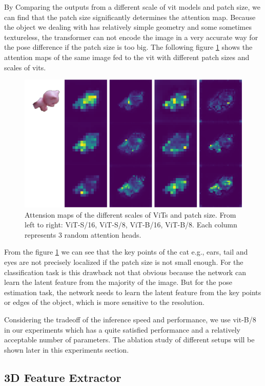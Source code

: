 \documentclass[12pt,DIV14,BCOR12mm,a4paper,footinclude=false,headinclude,parskip=half-,twoside,openright,cleardoublepage=empty,toc=index,bibliography=totoc,listof=totoc]{scrreprt}
\numberwithin{equation}{chapter}
\begin{document}
By Comparing the outputs from a different scale of \gls{vit} models and patch size, we can find that the patch size significantly determines the attention map. Because the object we dealing with has relatively simple geometry and some sometimes textureless, the transformer can not encode the image in a very accurate way for the pose difference if the patch size is too big. The following figure \ref{img:atten_patch} shows the attention maps of the same image fed to the \gls{vit} with different patch sizes and scales of \glspl{vit}. 
\begin{figure}[h]
	\centering
	\includegraphics[width=1.\textwidth]{img/atten_cat.png}
	\caption{Attension maps of the different scales of ViTs and patch size. From left to right: ViT-S/16, ViT-S/8, ViT-B/16, ViT-B/8. Each column represents 3 random attention heads.}
	\label{img:atten_patch}
\end{figure}

From the figure \ref{img:atten_patch} we can see that the key points of the cat e.g., ears, tail and eyes are not precisely localized if the patch size is not small enough. For the classification task is this drawback not that obvious because the network can learn the latent feature from the majority of the image. But for the pose estimation task, the network needs to learn the latent feature from the key points or edges of the object, which is more sensitive to the resolution.

Considering the tradeoff of the inference speed and performance, we use \gls{vit}-B/8 in our experiments which has a quite satisfied performance and a relatively acceptable number of parameters. The ablation study of different setups will be shown later in this experiments section.

\subsection{3D Feature Extractor}
\end{document}
